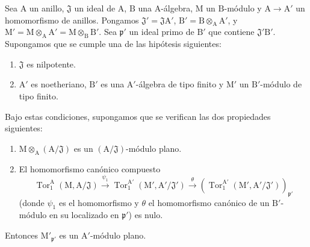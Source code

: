 \begin{lemma}[11.2.5]
\label{IV.11.2.5}
Sea $\mathrm{A}$ un anillo, $\mathfrak{J}$ un ideal de $\mathrm{A}$,
$\mathrm{B}$ una $\mathrm{A}$-álgebra, $\mathrm{M}$ un
$\mathrm{B}$-módulo y $\mathrm{A}\to\mathrm{A}'$ un homomorfismo de
anillos. Pongamos
$\mathfrak{J}'=\mathfrak{J}\mathrm{A}'$,
$\mathrm{B}'=\mathrm{B}\otimes_\mathrm{A}\mathrm{A}'$, y
$\mathrm{M}'=\mathrm{M}\otimes_\mathrm{A}\mathrm{A}'
=\mathrm{M}\otimes_\mathrm{B}\mathrm{B}'$. Sea
$\mathfrak{p}'$ un ideal primo de $\mathrm{B}'$ que contiene
$\mathfrak{J}'\mathrm{B}'$. Supongamos que se cumple una de las hipótesis
siguientes:
\begin{enumerate}[label=\emph{\alph*)}]
  \item $\mathfrak{J}$ es nilpotente.
  \item $\mathrm{A}'$ es noetheriano, $\mathrm{B}'$ es una $\mathrm{A}'$-álgebra de tipo finito y $\mathrm{M}'$ un $\mathrm{B}'$-módulo de tipo finito.
\end{enumerate}
Bajo estas condiciones, supongamos que se verifican las dos propiedades siguientes:
\begin{enumerate}[label=\emph{(\roman*)}]
  \item $\mathrm{M}\otimes_\mathrm{A}(\mathrm{A}/\mathfrak{J})$ es un $(\mathrm{A}/\mathfrak{J})$-módulo plano.
  \item El homomorfismo canónico compuesto
\[
  \operatorname{Tor}_1^\mathrm{A}(\mathrm{M},\mathrm{A}/\mathfrak{J})\xrightarrow{\psi_1}\operatorname{Tor}_1^{\mathrm{A}'}(\mathrm{M}',\mathrm{A}'/\mathfrak{J}')\xrightarrow{\theta}(\operatorname{Tor}_1^{\mathrm{A}'}(\mathrm{M}',\mathrm{A}'/\mathfrak{J}'))_{\mathfrak{p}'}
\]
(donde $\psi_1$ es el homomorfismo  y $\theta$ el homomorfismo canónico de un $\mathrm{B}'$-módulo en su localizado en $\mathfrak{p}'$) es nulo.
\end{enumerate}

Entonces $\mathrm{M}'_{\mathfrak{p}'}$ es un $\mathrm{A}'$-módulo plano.
\end{lemma}


